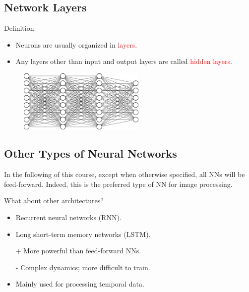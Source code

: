 \documentclass{book}
\newcommand{\alert}[1]{\textcolor{red}{#1}}
\begin{document}
\subsection{Network Layers}

\begin{myblock}{Definition}
\begin{itemize}
\item Neurons are usually organized in \alert{layers}.
\item Any layers other than input and output layers are called \alert{hidden layers}.
\end{itemize}
\end{myblock}

\begin{figure}[h]
    \centering
    \includegraphics[height=3cm]{mini_reseau3_bis}
\end{figure}

\subsection{Other Types of Neural Networks}

\begin{myblock}{}
In the following of this course, except when otherwise specified, all NNs will be feed-forward. Indeed, this is the preferred type of NN for image processing.
\end{myblock}

\begin{myblock}{What about other architectures?}
\begin{itemize}
\item Recurrent neural networks (RNN).
\item Long short-term memory networks (LSTM).
\end{itemize}
\end{myblock}

\begin{itemize}
\item[+] More powerful than feed-forward NNs.
\item[-] Complex dynamics; more difficult to train.
\item Mainly used for processing temporal data.
\end{itemize}
\end{document}
